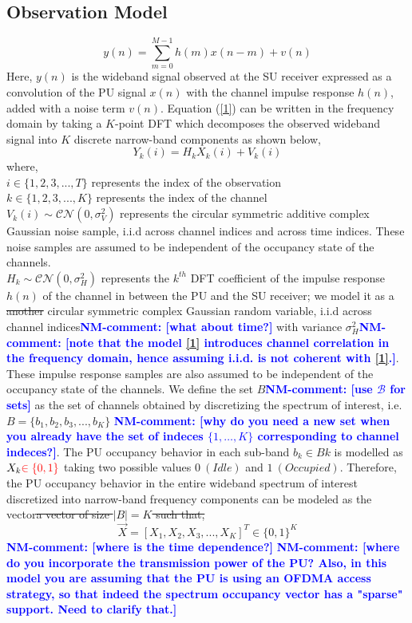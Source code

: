 \documentclass[conference]{IEEEtran}
\newcommand{\nm}[1]{\textcolor{blue}{\textbf{NM-comment: [#1]}}}
\newcommand{\add}[1]{{\color{red}#1}}
\newcommand{\sst}[1]{\st{#1}}
\begin{document}
\subsection{Observation Model}
\begin{equation}\label{1}
    y(n) = \sum_{m=0}^{M-1} h(m)x(n-m) + v(n)
\end{equation}
Here, $y(n)$ is the wideband signal observed at the SU receiver expressed as a convolution of the PU signal $x(n)$ with the channel impulse response $h(n)$, added with a noise term $v(n)$.
Equation (\ref{1}) can be written in the frequency domain by taking a $K$-point DFT which decomposes the observed wideband signal into $K$ discrete narrow-band components as shown below,
\begin{equation}\label{2}
    Y_k(i) = H_kX_k(i) + V_k(i)
\end{equation}
where,
\\$i \in \{1,2,3,...,T\}$ represents the index of the observation
\\$k \in \{1,2,3,...,K\}$ represents the index of the channel
\\$V_k(i) \sim \mathcal{CN}(0,\sigma_V^2)$ represents the circular symmetric additive complex Gaussian noise sample, i.i.d across channel indices and across time indices. These noise samples are assumed to be independent of the occupancy state of the channels.
\\$H_k \sim \mathcal{CN}(0,\sigma_H^2)$ represents the $k^{th}$ DFT coefficient of the impulse response $h(n)$ of the channel in between the PU and the SU receiver; \add{we model it as a} \sst{another} circular symmetric complex Gaussian random variable, i.i.d across channel indices\nm{what about time?} with variance $\sigma_H^2$\nm{note that the model \eqref{1} introduces channel correlation in the frequency domain, hence assuming i.i.d. is not coherent with \eqref{1}.}. These impulse response samples are also assumed to be independent of the occupancy state of the channels. 
We define the set $B$\nm{use $\mathcal B$ for sets} as the set of channels obtained by discretizing the spectrum of interest, i.e. $B=\{b_1,b_2,b_3,...,b_K\}$
\nm{why do you need a new set when you already have the set of indeces $\{1,\dots,K\}$ corresponding to channel indeces?}.
 The PU occupancy behavior in each sub-band \sst{$b_k \in B$}$k$ is modelled as $X_k\add{\in\{0,1\}}$ taking two possible values $0\ (Idle)$ and $1\ (Occupied)$. Therefore, the PU occupancy behavior in the entire wideband spectrum of interest discretized into narrow-band frequency components can be modeled as \add{the vector}\sst{a vector of size $|B|=K$ such that,}
\begin{equation}\label{3}
    \vec{X} = [X_1,X_2,X_3,...,X_K]^T \in \{0,1\}^K
\end{equation}
\nm{where is the time dependence?}
\nm{where do you incorporate the transmission power of the PU?
Also, in this model you are assuming that the PU is using an OFDMA access strategy, so that indeed the spectrum occupancy vector has a "sparse" support. Need to clarify that.}
\end{document}
